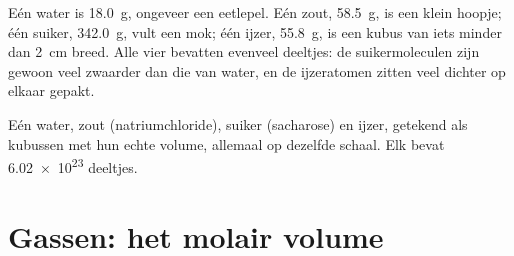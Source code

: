 \begin{example}\label{ex:g10:the-mole:bench}
Eén  water is \qty{18.0}{g}, ongeveer een eetlepel. Eén  zout,
\qty{58.5}{g}, is een klein hoopje; één  suiker, \qty{342.0}{g}, vult
een mok; één  ijzer, \qty{55.8}{g}, is een kubus van iets minder dan
\qty{2}{cm} breed. Alle vier bevatten evenveel deeltjes: de
suikermoleculen zijn gewoon veel zwaarder dan die van water, en de
ijzeratomen zitten veel dichter op elkaar gepakt.
\end{example}

\begin{omfigure}

{\small Eén  water, zout (natriumchloride), suiker (sacharose) en
ijzer, getekend als kubussen met hun echte volume, allemaal op dezelfde
schaal. Elk bevat \num{6.02e23} deeltjes.}
\end{omfigure}

\section{Gassen: het molair volume}

